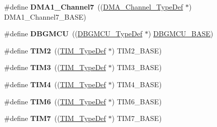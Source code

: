 \begin{DoxyCompactItemize}
\item 
\hypertarget{group___peripheral__declaration_ga4f9c23b3d1add93ed206b5c9afa5cda3}{\#define {\bfseries D\-M\-A1\-\_\-\-Channel7}~((\hyperlink{struct_d_m_a___channel___type_def}{D\-M\-A\-\_\-\-Channel\-\_\-\-Type\-Def} $\ast$) D\-M\-A1\-\_\-\-Channel7\-\_\-\-B\-A\-S\-E)}\label{group___peripheral__declaration_ga4f9c23b3d1add93ed206b5c9afa5cda3}

\item 
\hypertarget{group___peripheral__declaration_ga92ec6d9ec2251fda7d4ce09748cd74b4}{\#define {\bfseries D\-B\-G\-M\-C\-U}~((\hyperlink{struct_d_b_g_m_c_u___type_def}{D\-B\-G\-M\-C\-U\-\_\-\-Type\-Def} $\ast$) \hyperlink{group___peripheral__memory__map_ga4adaf4fd82ccc3a538f1f27a70cdbbef}{D\-B\-G\-M\-C\-U\-\_\-\-B\-A\-S\-E})}\label{group___peripheral__declaration_ga92ec6d9ec2251fda7d4ce09748cd74b4}

\item 
\hypertarget{group___peripheral__declaration_ga3cfac9f2e43673f790f8668d48b4b92b}{\#define {\bfseries T\-I\-M2}~((\hyperlink{struct_t_i_m___type_def}{T\-I\-M\-\_\-\-Type\-Def} $\ast$) T\-I\-M2\-\_\-\-B\-A\-S\-E)}\label{group___peripheral__declaration_ga3cfac9f2e43673f790f8668d48b4b92b}

\item 
\hypertarget{group___peripheral__declaration_ga61ee4c391385607d7af432b63905fcc9}{\#define {\bfseries T\-I\-M3}~((\hyperlink{struct_t_i_m___type_def}{T\-I\-M\-\_\-\-Type\-Def} $\ast$) T\-I\-M3\-\_\-\-B\-A\-S\-E)}\label{group___peripheral__declaration_ga61ee4c391385607d7af432b63905fcc9}

\item 
\hypertarget{group___peripheral__declaration_ga91a09bad8bdc7a1cb3d85cf49c94c8ec}{\#define {\bfseries T\-I\-M4}~((\hyperlink{struct_t_i_m___type_def}{T\-I\-M\-\_\-\-Type\-Def} $\ast$) T\-I\-M4\-\_\-\-B\-A\-S\-E)}\label{group___peripheral__declaration_ga91a09bad8bdc7a1cb3d85cf49c94c8ec}

\item 
\hypertarget{group___peripheral__declaration_gac7b4ed55f9201b498b38c962cca97314}{\#define {\bfseries T\-I\-M6}~((\hyperlink{struct_t_i_m___type_def}{T\-I\-M\-\_\-\-Type\-Def} $\ast$) T\-I\-M6\-\_\-\-B\-A\-S\-E)}\label{group___peripheral__declaration_gac7b4ed55f9201b498b38c962cca97314}

\item 
\hypertarget{group___peripheral__declaration_ga49267c49946fd61db6af8b49bcf16394}{\#define {\bfseries T\-I\-M7}~((\hyperlink{struct_t_i_m___type_def}{T\-I\-M\-\_\-\-Type\-Def} $\ast$) T\-I\-M7\-\_\-\-B\-A\-S\-E)}\label{group___peripheral__declaration_ga49267c49946fd61db6af8b49bcf16394}


\end{DoxyCompactItemize}
